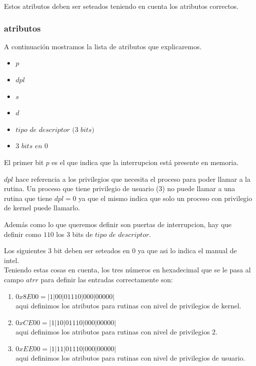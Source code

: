 \documentclass[a4paper,10pt,twoside]{article}
\begin{document}
Estos atributos deben ser seteados teniendo en cuenta los atributos correctos.

\subsubsection{atributos}

A continuación mostramos la lista de atributos que explicaremos.
\begin{itemize}
 \item $p$
 \item $dpl$
 \item $s$
 \item $d$
 \item $tipo$ $de$ $descriptor$ $(3$ $bits)$
 \item $3$ $bits$ $en$ $0$
\end{itemize}

El primer bit $p$ es el que indica que la interrupcion está presente en memoria.

$dpl$ hace referencia a los privilegios que necesita el proceso para poder llamar a la rutina. Un proceso que tiene privilegio de usuario ($3$) no puede llamar a una rutina que tiene $dpl = 0$ ya que el mismo indica que solo un proceso con privilegio de kernel puede llamarlo.

Además como lo que queremos definir son puertas de interrupcion, hay que definir como $1 1 0$ los 3 bits de $tipo$ $de$ $descriptor$.

Los siguientes 3 bit deben ser seteados en $0$ ya que asi lo indica el manual de intel.\\

Teniendo estas cosas en cuenta, los tres números en hexadecimal que se le pasa al campo $atrr$ para definir las entradas correctamente son:


\begin{enumerate}
 \item $0x8E00 = | 1 | 0 0 | 0 1 1 1 0 | 0 0 0 | 0 0 0 0 0 | $ \\ aqui definimos los atributos para rutinas con nivel de privilegios de kernel.
 \item $0xCE00 = | 1 | 1 0 | 0 1 1 1 0 | 0 0 0 | 0 0 0 0 0 | $ \\ aqui definimos los atributos para rutinas con nivel de privilegios $2$.
 \item $0xEE00 = | 1 | 1 1 | 0 1 1 1 0 | 0 0 0 | 0 0 0 0 0 | $ \\ aqui definimos los atributos para rutinas con nivel de privilegios de usuario.
\end{enumerate}
\end{document}
